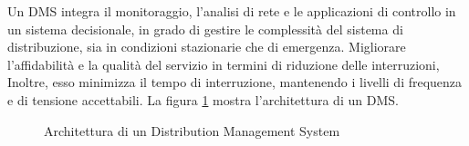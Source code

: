 Un DMS integra il monitoraggio, l'analisi di rete e le applicazioni di controllo in un sistema decisionale, in grado di gestire le complessità del sistema di distribuzione, sia in condizioni stazionarie che di emergenza. Migliorare l'affidabilità e la qualità del servizio in termini di riduzione delle interruzioni, Inoltre, esso minimizza il tempo di interruzione, mantenendo i livelli di frequenza e di tensione accettabili.  
La figura \ref{fig:2_11} mostra l'architettura di un DMS.

\begin{figure}[h] 
\caption{Architettura di un Distribution Management System}\label{fig:2_11}
\end{figure}

